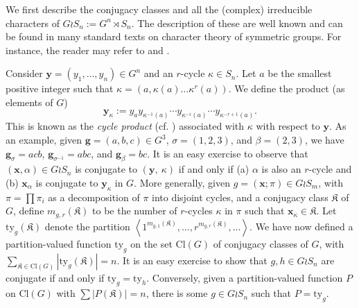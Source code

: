 \documentclass{amsart}
\theoremstyle{plain}
\theoremstyle{remark}\newtheorem{con}[theorem]{Construction}
\theoremstyle{remark} \newtheorem*{remark}{Remark}
\theoremstyle{remark} \newtheorem{example}{Example}
\newcommand{\mrm}{\mathrm}
\newcommand{\mbf}{\mathbf}
\newcommand{\mfk}{\mathfrak}
\begin{document}
We first describe the conjugacy classes and all the (complex) irreducible characters of $G \wr S_{n}:= G^{n} \rtimes S_{n}$. The description of these are well known and can be found in many standard texts on character theory of symmetric groups. For instance, the reader may refer to \cite[Chapter 4]{James_1984} and \cite[Appendix B of Chapter 1]{macdonald1998symmetric}. 

 Consider $\mbf{y}=(y_{1},\ldots,y_{n}) \in G^{n}$ and an $r$-cycle $\kappa\in S_{n}$. Let $a$ be the smallest positive integer such that $\kappa=(a,\kappa(a)\ldots \kappa^{r}(a))$. We define the product (as elements of $G$) 
 \begin{equation}\label{eq:cyclicproduct}
 \mbf{y}_{\kappa} := y_{a}y_{\kappa^{-1}(a)} \cdots    y_{\kappa^{-i}(a)}  \cdots y_{\kappa^{-r+1}(a)}.
 \end{equation}
 This is known as the {\it cycle product} (cf. \cite[4.2.1]{James_1984}) associated with $\kappa$ with respect to $\mbf{y}$. As an example, given $\mbf{g}=(a,b,c) \in G^{3}$, $\sigma =(1,2,3)$, and $\beta=(2,3)$, we have $\mbf{g}_{\sigma}=acb$, $\mbf{g}_{\sigma^{-1}}=abc$, and $\mbf{g}_{\beta}=bc$. It is an easy exercise to observe that $(\mbf{x}, \alpha)\in G\wr S_{n}$ is conjugate to $(\mbf{y},\ \kappa)$ if and only if (a) $\alpha$ is also an $r$-cycle and (b) $\mbf{x}_{\alpha}$ is conjugate to $\mbf{y}_{\kappa}$ in $G$. More generally, given $g=(\mbf{x}; \pi) \in G \wr S_{m}$, with $\pi=\prod \pi_{i}$ as a decomposition of $\pi$ into disjoint cycles, and a conjugacy class $\mfk{K}$ of $G$, define $m_{g,r}(\mfk{K})$ to be the number of $r$-cycles $\kappa$ in $\pi$ such that $\mbf{x}_{\kappa} \in \mfk{K}$. Let $\mrm{ty}_{g}(\mfk{K})$ denote the partition $\left\langle 1^{m_{g,1}(\mfk{K})}, \ldots, r^{m_{g,r}(\mfk{K})}, \ldots \right\rangle$. We have now defined a partition-valued function $\mrm{ty}_{g}$ on  the set $\mrm{Cl}(G)$ of conjugacy classes of $G$, with $\sum\limits_{\mfk{K} \in \mrm{Cl}(G)} |\mrm{ty}_{g}(\mfk{K})| =n$. It is an easy exercise to show that $g,h \in G \wr S_{n}$ are conjugate if and only if $\mrm{ty}_{g}= \mrm{ty}_{h}$. Conversely, given a partition-valued function $P$ on $\mrm{Cl}(G)$ with $\sum |P(\mfk{K})|=n$, there is some $g \in G \wr S_{n}$ such that $P=\mrm{ty}_{g}$. 
 
\end{document}
